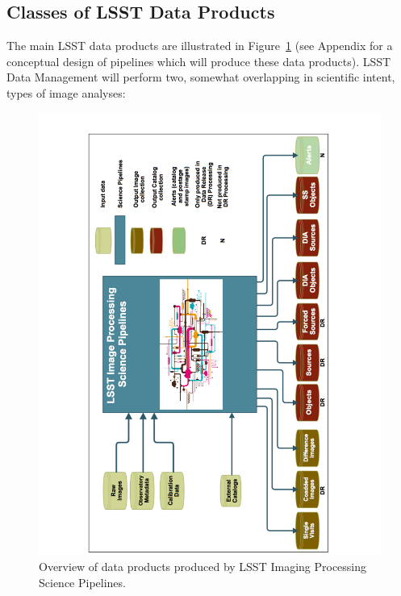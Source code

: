 \documentclass[SE,lsstdraft,toc]{lsstdoc}
\begin{document}
\subsection{Classes of LSST Data Products}

The main LSST data products are illustrated in Figure~\ref{fig:Detail0} (see Appendix for
a conceptual design of pipelines which will produce these data products).
LSST Data Management will perform two, somewhat overlapping in scientific intent, types of image analyses:


\begin{figure}[!t]
    \centering
    \vskip -0.7in
    \includegraphics[scale=0.515, angle=270]{gliffy/LSSTimageProcessingDetail0}
    \vskip -0.7in
    \caption{Overview of data products produced by LSST Imaging Processing Science Pipelines.\label{fig:Detail0}}
\end{figure}
\end{document}

